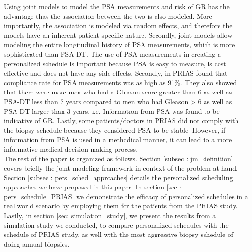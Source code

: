 Using joint models to model the PSA measurements and risk of GR has the advantage that the association between the two is also modeled. More importantly, the association is modeled via random effects, and therefore the models have an inherent patient specific nature. Secondly, joint models allow modeling the entire longitudinal history of PSA measurements, which is more sophisticated than PSA-DT. The use of PSA measurements in creating a personalized schedule is important because PSA is easy to measure, is cost effective and does not have any side effects. Secondly, in PRIAS \cite{bokhorst2015compliance} found that compliance rate for PSA measurements was as high as 91\%. They also showed that there were more men who had a Gleason score greater than 6 as well as PSA-DT less than 3 years compared to men who had Gleason > 6 as well as PSA-DT larger than 3 years. i.e. Information from PSA was found to be indicative of GR. Lastly, some patients/doctors in PRIAS did not comply with the biopsy schedule because they considered PSA to be stable. However, if information from PSA is used in a methodical manner, it can lead to a more informative medical decision making process.\\

The rest of the paper is organized as follows. Section \ref{subsec : jm_definition} covers briefly the joint modeling framework in context of the problem at hand. Section \ref{subsec : pers_sched_approaches} details the personalized scheduling approaches we have proposed in this paper. In section \ref{sec : pers_schedule_PRIAS} we demonstrate the efficacy of personalized schedules in a real world scenario by employing them for the patients from  the PRIAS study. Lastly, in section \ref{sec: simulation_study}, we present the results from a simulation study we conducted, to compare personalized schedules with the schedule of PRIAS study, as well with the most aggressive biopsy schedule of doing annual biopsies.